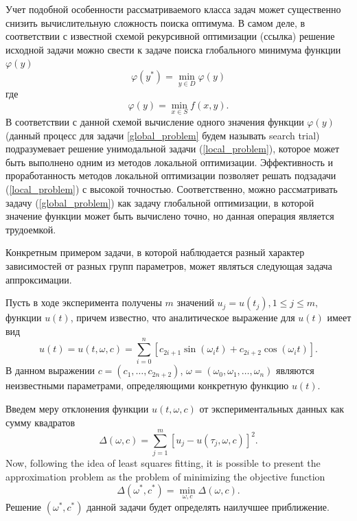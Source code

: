 \documentclass{svproc}
\begin{document}
Учет подобной особенности рассматриваемого класса задач может существенно снизить вычислительную сложность поиска оптимума. В самом деле, в соответствии с известной схемой рекурсивной оптимизации (ссылка) решение исходной задачи можно свести к задаче поиска глобального минимума функции $\varphi(y)$
\begin{equation}\label{global_problem}
\varphi(y^*) = \min_{y\in D}  \varphi (y)
\end{equation}
где 
\begin{equation}\label{local_problem}
\varphi(y) = \min_{x\in S} f(x,y).
\end{equation}
В соответствии с данной схемой вычисление одного значения функции $\varphi (y)$ (данный процесс для задачи \ref{global_problem} будем называть search trial) подразумевает решение унимодальной задачи (\ref{local_problem}), которое может быть выполнено одним из методов локальной оптимизации. Эффективность и проработанность методов локальной оптимизации позволяет решать подзадачи (\ref{local_problem}) с высокой точностью. Соответственно, можно рассматривать задачу (\ref{global_problem}) как задачу глобальной оптимизации, в которой значение функции может быть вычислено точно, но данная операция является трудоемкой. 

Конкретным примером задачи, в которой наблюдается разный характер зависимостей от разных групп параметров, может являться следующая задача аппроксимации.

Пусть в ходе эксперимента получены $m$ значений $u_j = u(t_j), 1 \leq j \leq m, $ функции $u(t)$, причем известно, что аналитическое выражение для  $u(t)$ имеет вид
\begin{equation}\label{ex_func}
u(t) = u(t,\omega,c)=\sum^{n}_{i=0}\left[c_{2i+1}\sin(\omega_it) + c_{2i+2}\cos(\omega_it)\right].	
\end{equation}
В данном выражении $c=\left(c_1,\ldots,c_{2n+2}\right)$, $\omega=\left(\omega_0,\omega_1,\ldots,\omega_n\right)$ являются неизвестными параметрами, определяющими конкретную функцию $u(t)$.

Введем меру отклонения функции $u(t,\omega,c)$ от экспериментальных данных как сумму квадратов
\[
\Delta(\omega,c)= \sum^{m}_{j=1}\left[u_j-u(\tau_j,\omega,c)\right]^2. 
\]
Now, following the idea of least squares fitting, it is possible to present the approximation problem as the problem of minimizing the objective function
\begin{equation}\label{ex_prob}
\Delta(\omega^*,c^*) = \min_{\omega,c} \Delta(\omega,c).	
\end{equation}
Решение $(\omega^*,c^*)$ данной задачи будет определять наилучшее приближение.
\end{document}
